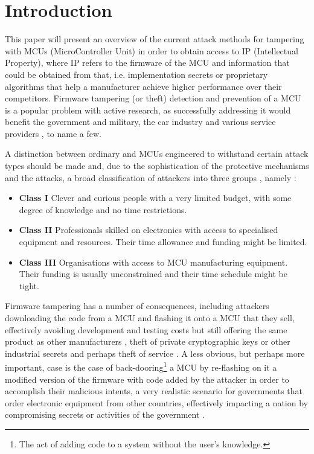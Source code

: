 \section{Introduction}
	This paper will present an overview of the current attack methods for tampering with MCUs (MicroController Unit) in order to obtain access to IP (Intellectual Property), where IP refers to the firmware of the MCU and information that could be obtained from that, i.e. implementation secrets or proprietary algorithms that help a manufacturer achieve higher performance over their competitors. Firmware tampering (or theft) detection and prevention of a MCU is a popular problem with active research, as successfully addressing it would benefit the government and military, the car industry and various service providers \citep{sergei:thesis}, to name a few.
	
	A distinction between ordinary and MCUs engineered to withstand certain attack types should be made\citep{sergei:thesis} and, due to the sophistication of the protective mechanisms and the attacks, a broad classification of attackers into three groups \cite{anderson:cautionary_note}, namely :
		\begin{itemize}
			\item \textbf{Class I} Clever and curious people with a very limited budget, with some degree of knowledge and no time restrictions.\\
			\item \textbf{Class II} Professionals skilled on electronics with access to specialised equipment and resources. Their time allowance and funding might be limited.\\
			\item \textbf{Class III} Organisations with access to MCU manufacturing equipment. Their funding is usually unconstrained and their time schedule might be tight.
		\end{itemize}
	
	Firmware tampering has a number of consequences, including attackers downloading the code from a MCU and flashing it onto a MCU that they sell, effectively avoiding development and testing costs but still offering the same product as other manufacturers \cite{tech:aes_bls}, theft of private cryptographic keys or other industrial secrets and perhaps theft of service \citep{sergei:thesis}. A less obvious, but perhaps more important, case is the case of back-dooring\footnote{The act of adding code to a system without the user's knowledge.} a MCU by re-flashing on it a modified version of the firmware with code added by the attacker in order to accomplish their malicious intents, a very realistic scenario for governments that order electronic equipment from other countries, effectively impacting a nation by compromising secrets or activities of the government .

